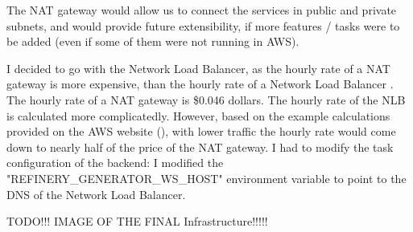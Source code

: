 		The NAT gateway would allow us to connect the services in public and private subnets, and would provide future extensibility, if more 
		features / tasks were to be added (even if some of them were not running in AWS).

		I decided to go with the Network Load Balancer, as the hourly rate of a NAT gateway is more expensive, than the hourly rate of a 
		Network Load Balancer \cite{natprice} \cite{nlbprice}. The hourly rate of a NAT gateway is \$0.046 dollars. The hourly rate of 
		the NLB is calculated more complicatedly. However, based on the example calculations provided on the AWS website (\cite{nlbprice}),
		with lower traffic the hourly rate would come down to nearly half of the price of the NAT gateway. I had to modify the task 
		configuration of the backend: I modified the "REFINERY\_GENERATOR\_WS\_HOST" environment variable to point to the DNS of the 
		Network Load Balancer. 

		TODO!!! IMAGE OF THE FINAL Infrastructure!!!!!
